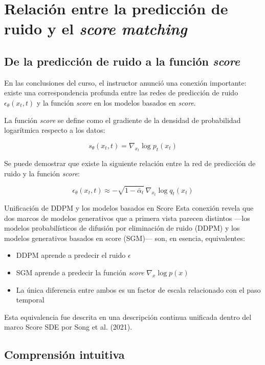 \section{Relación entre la predicción de ruido y el \textit{score matching}}

\subsection{De la predicción de ruido a la función \textit{score}}

En las conclusiones del curso, el instructor anunció una conexión importante: existe una correspondencia profunda entre las redes de predicción de ruido $\epsilon_\theta(x_t, t)$ y la función \textit{score} en los modelos basados en \textit{score}.

La función \textit{score} se define como el gradiente de la densidad de probabilidad logarítmica respecto a los datos:

$$s_\theta(x_t, t) = \nabla_{x_t} \log p_t(x_t)$$

Se puede demostrar que existe la siguiente relación entre la red de predicción de ruido y la función \textit{score}:

$$\epsilon_\theta(x_t, t) \approx -\sqrt{1 - \bar{\alpha}_t}\, \nabla_{x_t} \log q_t(x_t)$$

\begin{knowledgebox}{Unificación de DDPM y los modelos basados en Score}
Esta conexión revela que dos marcos de modelos generativos que a primera vista parecen distintos —los modelos probabilísticos de difusión por eliminación de ruido (DDPM) y los modelos generativos basados en score (SGM)— son, en esencia, equivalentes:
\begin{itemize}
    \item DDPM aprende a predecir el ruido $\epsilon$
    \item SGM aprende a predecir la función \textit{score} $\nabla_x \log p(x)$
    \item La única diferencia entre ambos es un factor de escala relacionado con el paso temporal
\end{itemize}
Esta equivalencia fue descrita en una descripción continua unificada dentro del marco Score SDE por Song et al. (2021).
\end{knowledgebox}

\subsection{Comprensión intuitiva}


